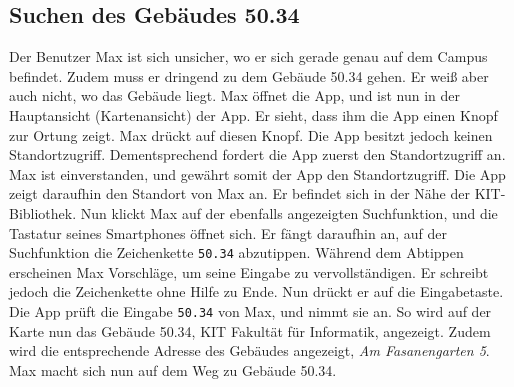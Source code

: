 \subsection{Suchen des Gebäudes 50.34}

Der Benutzer Max ist sich unsicher, wo er sich gerade genau auf dem \Gls{Campus} befindet.
Zudem muss er dringend zu dem Gebäude 50.34 gehen.
Er weiß aber auch nicht, wo das Gebäude liegt.
Max öffnet die App, und ist nun in der Hauptansicht (\Gls{Kartenansicht}) der App.
Er sieht, dass ihm die App einen Knopf zur \Gls{Ortung} zeigt.
Max drückt auf diesen Knopf.
Die App besitzt jedoch keinen Standortzugriff.
Dementsprechend fordert die App zuerst den Standortzugriff an.
Max ist einverstanden, und gewährt somit der App den Standortzugriff.
Die App zeigt daraufhin den Standort von Max an.
Er befindet sich in der Nähe der \Gls{KIT}-Bibliothek.
Nun klickt Max auf der ebenfalls angezeigten Suchfunktion, und die Tastatur seines Smartphones öffnet sich.
Er fängt daraufhin an, auf der Suchfunktion die \Gls{Zeichenkette} \texttt{50.34} abzutippen. 
Während dem Abtippen erscheinen Max Vorschläge, um seine Eingabe zu vervollständigen. 
Er schreibt jedoch die \Gls{Zeichenkette} ohne Hilfe zu Ende. 
Nun drückt er auf die Eingabetaste. 
Die App prüft die Eingabe \texttt{50.34} von Max, und nimmt sie an. 
So wird auf der Karte nun das Gebäude 50.34, \Gls{KIT} Fakultät für Informatik, angezeigt. 
Zudem wird die entsprechende Adresse des Gebäudes angezeigt, \textit{Am Fasanengarten 5}. 
Max macht sich nun auf dem Weg zu Gebäude 50.34.